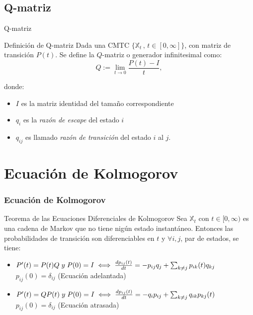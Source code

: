 \documentclass{beamer}
\begin{document}
\subsection{Q-matriz}
\begin{frame}{Q-matriz}
\begin{block}{Definición de Q-matriz}
Dada una CMTC $\{\mathbb{X}_t \, , \, t\in [0,\infty]\}$, con matriz de transición $P(t)$. Se define la $Q$-matriz o generador infinitesimal como:
$$Q:=\lim_{t \to 0}\dfrac{P(t)-I}{t},$$
\end{block}
donde:
\begin{itemize}
\item $I$ es la matriz identidad del tamaño correspondiente
\item  $q_i$ es la \textit{razón de escape} del estado $i$
\item $q_{ij}$ es llamado \textit{razón de transición} del estado $i$ al $j$.
\end{itemize}
\end{frame}
\section{Ecuación de Kolmogorov}

\begin{frame}
    \frametitle{Ecuación de Kolmogorov}
    \begin{block}{Teorema de las Ecuaciones Diferenciales de Kolmogorov}
    Sea $\mathbb{X}_{t}$ con $t \in [0,\infty)$ es una cadena de Markov que no tiene nigún estado instantáneo. Entonces las probabilidades de transición son diferenciables en $t$ y $\forall i,j$, par de estados, se tiene:
\begin{itemize}
			\item $P'(t) = P(t)Q\hspace{0.1cm}y\hspace{0.1cm}P(0) = I \iff \frac{dp_{ij}(t)}{dt} = -p_{ij}q_{j} + \sum_{k \neq j} p_{ik}(t)q_{kj} \hspace{0.5cm}$
			\newline
			$ p_{ij}(0) = \delta_{ij}$  (Ecuación adelantada)
			\item $P'(t) = QP(t)\hspace{0.1cm}y\hspace{0.1cm}P(0) = I\iff \frac{dp_{ij}(t)}{dt} = -q_{i}p_{ij} + \sum_{k \neq j} q_{ik}p_{kj}(t)$
			\newline
			$p_{ij}(0) = \delta_{ij}$   (Ecuación atrasada)
\end{itemize}
    \end{block}
\end{frame}
\end{document}
